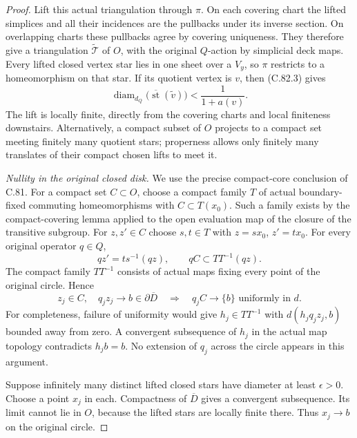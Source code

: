 \begin{proof}
Lift this actual triangulation through $\pi$.
On each covering chart the lifted simplices
and all their incidences are the pullbacks
under its inverse section. On overlapping
charts these pullbacks agree by covering
uniqueness. They therefore give a triangulation
$\widetilde{\mathcal T}$ of $O$, with the
original $Q$-action by simplicial deck maps.
Every lifted closed vertex star lies in one
sheet over a $V_y$, so $\pi$ restricts to a
homeomorphism on that star. If its quotient
vertex is $v$, then (C.82.3) gives
\[
 \operatorname{diam}_{d_Q}
       \bigl(\overline{\operatorname{st}}(\widetilde v)
                                             \bigr)
       <\frac1{1+a(v)}.
                                                               \tag{C.82.4}
\]
The lift is locally finite, directly from
the covering charts and local finiteness
downstairs. Alternatively, a compact subset
of $O$ projects to a compact set meeting
finitely many quotient stars; properness
allows only finitely many translates of
their compact chosen lifts to meet it.

\emph{Nullity in the original closed disk.}
We use the precise compact-core conclusion
of C.81. For a compact set $C\subset O$,
choose a compact family $T$ of actual
boundary-fixed commuting homeomorphisms
with $C\subset T(x_0)$. Such a family exists
by the compact-covering lemma applied to
the open evaluation map of the closure of
the transitive subgroup. For $z,z'\in C$
choose $s,t\in T$ with $z=sx_0$, $z'=tx_0$.
For every original operator $q\in Q$,
\[
           qz'=t s^{-1}(qz),
       \qquad qC\subset TT^{-1}(qz).
                                                               \tag{C.82.5}
\]
The compact family $TT^{-1}$ consists of
actual maps fixing every point of the
original circle. Hence
\[
 z_j\in C,\quad q_jz_j\longrightarrow b\in\partial\overline D
       \quad\Longrightarrow\quad
            q_jC\longrightarrow\{b\}
             \text{ uniformly in }d.
                                                               \tag{C.82.6}
\]
For completeness, failure of uniformity
would give $h_j\in TT^{-1}$ with
$d(h_jq_jz_j,b)$ bounded away from zero.
A convergent subsequence of $h_j$ in the
actual map topology contradicts $h_jb=b$.
No extension of $q_j$ across the circle
appears in this argument.

Suppose infinitely many distinct lifted
closed stars have diameter at least
$\epsilon>0$. Choose a point $x_j$ in each.
Compactness of $\overline D$ gives a
convergent subsequence. Its limit cannot
lie in $O$, because the lifted stars are
locally finite there. Thus $x_j\to b$ on
the original circle.


\end{proof}
